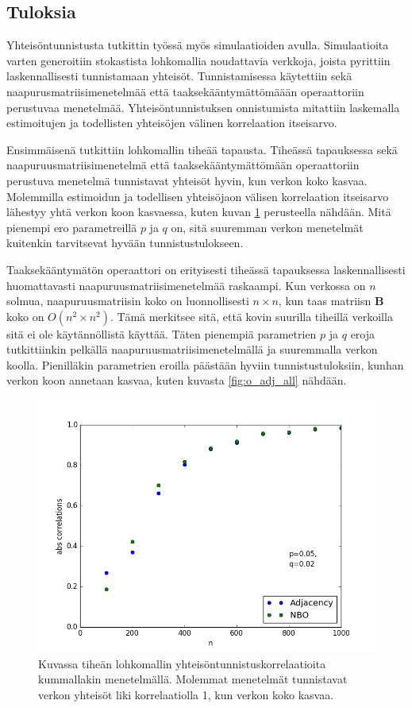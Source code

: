 \documentclass[finnish,12pt,a4paper,pdftex,sci,utf8]{aaltothesis}
\begin{document}
\subsection{Tuloksia}
Yhteisöntunnistusta tutkittin työssä myös simulaatioiden avulla. Simulaatioita varten generoitiin stokastista lohkomallia noudattavia verkkoja, joista pyrittiin laskennallisesti tunnistamaan yhteisöt. Tunnistamisessa käytettiin sekä naapurusmatriisimenetelmää että taaksekääntymättömäään operaattoriin perustuvaa menetelmää. Yhteisöntunnistuksen onnistumista mitattiin laskemalla estimoitujen ja todellisten yhteisöjen välinen korrelaation itseisarvo.

Ensimmäisenä tutkittiin lohkomallin tiheää tapausta. Tiheässä tapauksessa sekä naapuruusmatriisimenetelmä että taaksekääntymättömään operaattoriin perustuva menetelmä tunnistavat yhteisöt hyvin, kun verkon koko kasvaa. Molemmilla estimoidun ja todellisen yhteisöjaon välisen korrelaation itseisarvo lähestyy yhtä verkon koon kasvaessa, kuten kuvan \ref{fig:dense} perusteella nähdään. Mitä pienempi ero parametreillä $p$ ja $q$ on, sitä suuremman verkon menetelmät kuitenkin tarvitsevat hyvään tunnistustulokseen.

Taaksekääntymätön operaattori on erityisesti tiheässä tapauksessa laskennallisesti huomattavasti naapuruusmatriisimenetelmää raskaampi. Kun verkossa on $n$ solmua, naapuruusmatriisin koko on luonnollisesti $n \times n$, kun taas matriisn $\mathbf{B}$ koko on $O(n^2 \times n^2)$. Tämä merkitsee sitä, että kovin suurilla tiheillä verkoilla sitä ei ole käytännöllistä käyttää. Täten pienempiä parametrien $p$ ja $q$ eroja tutkittiinkin pelkällä naapuruusmatriisimenetelmällä ja suuremmalla verkon koolla. Pienilläkin parametrien eroilla päästään hyviin tunnistustuloksiin, kunhan verkon koon annetaan kasvaa, kuten kuvasta \ref{fig:o_adj_all} nähdään.

\begin{figure}
	\centering
	\includegraphics[width = \textwidth]{adj_nbo_den_2.png}
	\caption{Kuvassa tiheän lohkomallin yhteisöntunnistuskorrelaatioita kummallakin menetelmällä. Molemmat menetelmät tunnistavat verkon yhteisöt liki korrelaatiolla 1, kun verkon koko kasvaa.}
	\label{fig:dense}
\end{figure}
\end{document}
